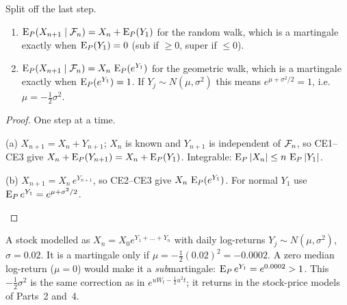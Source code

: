 \begin{result}
\label{res:rw-mg}
Split off the last step.
\begin{enumerate}[label=(\alph*)]
  \item $\operatorname{E}_P(X_{n+1}\mid\mathcal F_n)=X_n+\operatorname{E}_P(Y_1)$ for the random walk, which is a martingale exactly when $\operatorname{E}_P(Y_1)=0$ (sub if $\ge0$, super if $\le0$).
  \item $\operatorname{E}_P(X_{n+1}\mid\mathcal F_n)=X_n\,\operatorname{E}_P(e^{Y_1})$ for the geometric walk, which is a martingale exactly when $\operatorname{E}_P(e^{Y_1})=1$. If $Y_j\sim N(\mu,\sigma^2)$ this means $e^{\mu+\sigma^2/2}=1$, i.e.\ $\mu=-\frac12\sigma^2$.
\end{enumerate}
\end{result}
\begin{proof}
One step at a time.
\begin{steps}
  \item (a) $X_{n+1}=X_n+Y_{n+1}$; $X_n$ is known and $Y_{n+1}$ is independent of $\mathcal F_n$, so CE1--CE3 give $X_n+\operatorname{E}_P(Y_{n+1})=X_n+\operatorname{E}_P(Y_1)$. Integrable: $\operatorname{E}_P|X_n|\le n\,\operatorname{E}_P|Y_1|$.
  \item (b) $X_{n+1}=X_n\,e^{Y_{n+1}}$, so CE2--CE3 give $X_n\,\operatorname{E}_P(e^{Y_1})$. For normal $Y_1$ use $\operatorname{E}_Pe^{Y_1}=e^{\mu+\sigma^2/2}$. \qedhere
\end{steps}
\end{proof}

\begin{pic}
\end{pic}

\begin{example}
\label{ex:drift-correction}
A stock modelled as $X_n=X_0e^{Y_1+\dots+Y_n}$ with daily log-returns $Y_j\sim N(\mu,\sigma^2)$, $\sigma=0.02$. It is a martingale only if $\mu=-\frac12(0.02)^2=-0.0002$. A zero median log-return ($\mu=0$) would make it a \emph{sub}martingale: $\operatorname{E}_Pe^{Y_1}=e^{0.0002}>1$. This $-\frac12\sigma^2$ is the same correction as in $e^{uW_t-\frac12u^2t}$; it returns in the stock-price models of Parts~2 and~4.
\end{example}

